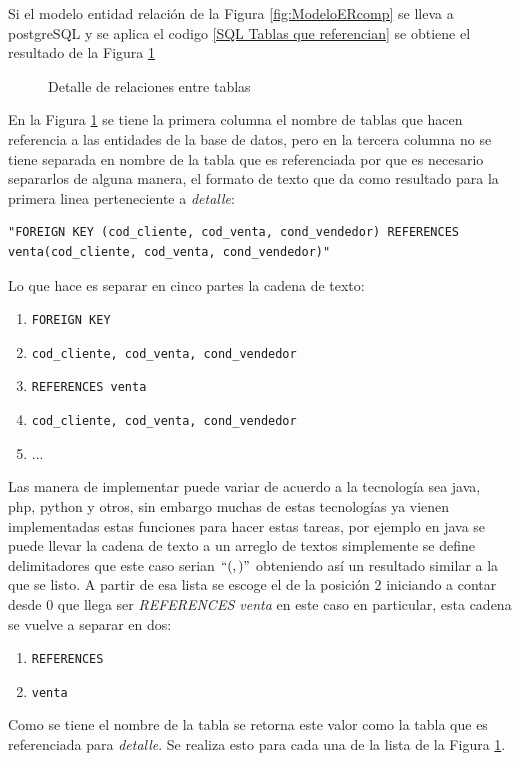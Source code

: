 Si el modelo entidad relaci\'on de la Figura \ref{fig:ModeloERcomp} se lleva a postgreSQL y se aplica el codigo \ref{SQL Tablas que referencian} se obtiene el resultado de la Figura \ref{fig:referenciasModeloComp}

\begin{figure}[H]
\centering
{}
\caption{Detalle de relaciones entre tablas} \label{fig:referenciasModeloComp}
\end{figure}

En la Figura \ref{fig:referenciasModeloComp} se tiene la primera columna el nombre de tablas que hacen referencia a las entidades de la base de datos, pero en la tercera columna no se tiene separada en nombre de la tabla que es referenciada por que es necesario separarlos de alguna manera, el formato de texto que da como resultado para la primera linea perteneciente a \textit{detalle}:
\lstset{language=sql,breaklines=true}
\begin{lstlisting}
"FOREIGN KEY (cod_cliente, cod_venta, cond_vendedor) REFERENCES venta(cod_cliente, cod_venta, cond_vendedor)"
\end{lstlisting}
Lo que hace es separar en cinco partes la cadena de texto:
\begin{enumerate}
\item \texttt{FOREIGN KEY}
\item \texttt{cod\_cliente, cod\_venta, cond\_vendedor}
\item \texttt{REFERENCES venta}
\item \texttt{cod\_cliente, cod\_venta, cond\_vendedor}
\item ...
\end{enumerate}
Las manera de implementar puede variar de acuerdo a la tecnolog\'ia sea java, php, python y otros, sin embargo muchas de estas tecnolog\'ias ya vienen implementadas estas funciones para hacer estas tareas, por ejemplo en java se puede llevar la cadena de texto a un arreglo de textos simplemente se define delimitadores que este caso serian $`` (  ,  )  "$   obteniendo as\'i un resultado similar a la que se listo. A partir de esa lista se escoge el de la posici\'on 2 iniciando a contar desde 0 que llega ser \textit{REFERENCES venta} en este caso en particular, esta cadena se vuelve a separar en dos:
\begin{enumerate}
\item \texttt{REFERENCES}
\item \texttt{venta}
\end{enumerate}
Como se tiene el nombre de la tabla se retorna este valor como la tabla que es referenciada para \textit{detalle}. Se realiza esto para cada una de la lista de la Figura \ref{fig:referenciasModeloComp}.

